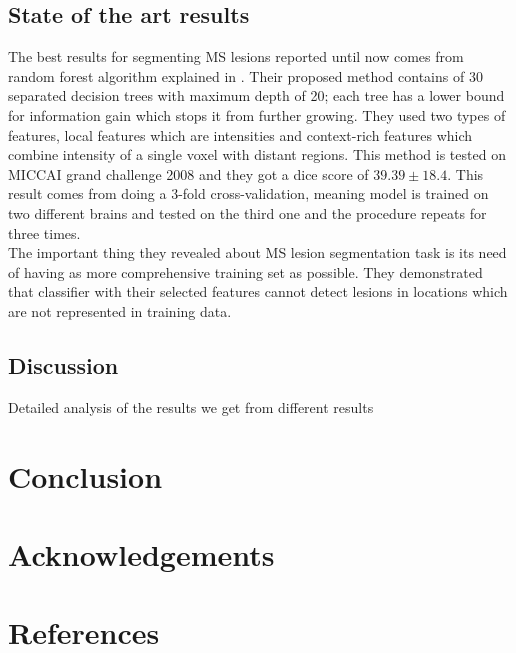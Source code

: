 \documentclass{article} %
\begin{document}
\subsection{State of the art results}
The best results for segmenting MS lesions reported until now comes from random forest algorithm explained in \cite{geremia2011spatial}. Their proposed method contains of 30 separated decision trees with maximum depth of 20; each tree has a lower bound for information gain which stops it from further growing. They used two types of features, local features which are intensities and context-rich features which combine intensity of a single voxel with distant regions. This method is tested on MICCAI grand challenge 2008 and they got a dice score of $39.39 \pm 18.4$. This result comes from doing a 3-fold cross-validation, meaning model is trained on two different brains and tested on the third one and the procedure repeats for three times.\\
The important thing they revealed about MS lesion segmentation task is its need of having as more comprehensive training set as possible. They demonstrated that classifier with their selected features cannot detect lesions in locations which are not represented in training data.

\subsection{Discussion}
Detailed analysis of the results we get from different results

\section{Conclusion}

\section{Acknowledgements}

\section{References}



\end{document}
